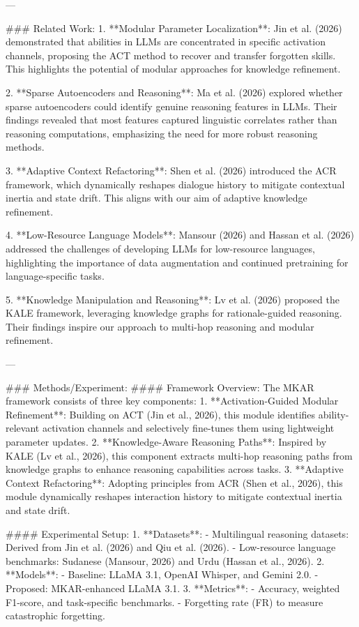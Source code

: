 ---

### Related Work:
1. **Modular Parameter Localization**: Jin et al. (2026) demonstrated that abilities in LLMs are concentrated in specific activation channels, proposing the ACT method to recover and transfer forgotten skills. This highlights the potential of modular approaches for knowledge refinement.

2. **Sparse Autoencoders and Reasoning**: Ma et al. (2026) explored whether sparse autoencoders could identify genuine reasoning features in LLMs. Their findings revealed that most features captured linguistic correlates rather than reasoning computations, emphasizing the need for more robust reasoning methods.

3. **Adaptive Context Refactoring**: Shen et al. (2026) introduced the ACR framework, which dynamically reshapes dialogue history to mitigate contextual inertia and state drift. This aligns with our aim of adaptive knowledge refinement.

4. **Low-Resource Language Models**: Mansour (2026) and Hassan et al. (2026) addressed the challenges of developing LLMs for low-resource languages, highlighting the importance of data augmentation and continued pretraining for language-specific tasks.

5. **Knowledge Manipulation and Reasoning**: Lv et al. (2026) proposed the KALE framework, leveraging knowledge graphs for rationale-guided reasoning. Their findings inspire our approach to multi-hop reasoning and modular refinement.

---

### Methods/Experiment:
#### Framework Overview:
The MKAR framework consists of three key components:
1. **Activation-Guided Modular Refinement**: Building on ACT (Jin et al., 2026), this module identifies ability-relevant activation channels and selectively fine-tunes them using lightweight parameter updates.
2. **Knowledge-Aware Reasoning Paths**: Inspired by KALE (Lv et al., 2026), this component extracts multi-hop reasoning paths from knowledge graphs to enhance reasoning capabilities across tasks.
3. **Adaptive Context Refactoring**: Adopting principles from ACR (Shen et al., 2026), this module dynamically reshapes interaction history to mitigate contextual inertia and state drift.

#### Experimental Setup:
1. **Datasets**:
   - Multilingual reasoning datasets: Derived from Jin et al. (2026) and Qiu et al. (2026).
   - Low-resource language benchmarks: Sudanese (Mansour, 2026) and Urdu (Hassan et al., 2026).
2. **Models**:
   - Baseline: LLaMA 3.1, OpenAI Whisper, and Gemini 2.0.
   - Proposed: MKAR-enhanced LLaMA 3.1.
3. **Metrics**:
   - Accuracy, weighted F1-score, and task-specific benchmarks.
   - Forgetting rate (FR) to measure catastrophic forgetting.

